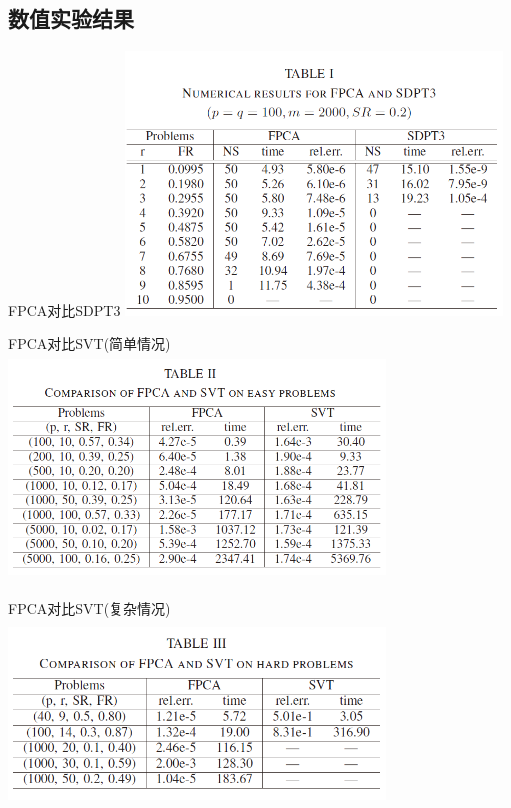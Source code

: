 \documentclass[slidestop, compress, mathserif, UTF8]{beamer}
\numberwithin{equation}{section}                                        %
\begin{document}
        \subsection{数值实验结果}
            \begin{frame}[t]{FPCA对比SDPT3}
                \centering
                    \includegraphics[width=10cm,height=7cm]{src//1.png}
            \end{frame}
            \begin{frame}[t]{FPCA对比SVT(简单情况)}
                \centering
                    \includegraphics[width=10cm,height=6cm]{src//2.png}
            \end{frame}
            \begin{frame}[t]{FPCA对比SVT(复杂情况)}
                \vspace{10mm}
                \centering
                    \includegraphics[width=10cm,height=5cm]{src//3.png}
            \end{frame}
\end{document}
